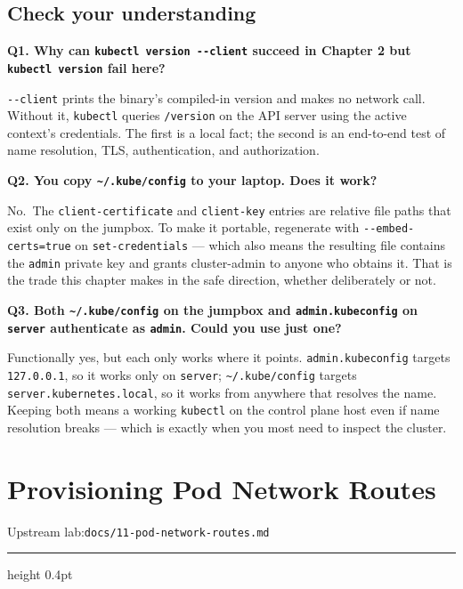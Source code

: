 \documentclass[11pt,oneside]{report}
\newcommand{\upstreamlab}[1]{%
  {\sffamily\footnotesize\color{steel}Upstream lab:\quad\texttt{#1}}\par\vspace{2pt}%
  {\color{rule}\hrule height 0.4pt}\vspace{8pt}}
\begin{document}
\hypertarget{check-your-understanding-10}{%
\section{Check your
understanding}\label{check-your-understanding-10}}

\textbf{Q1. Why can
\texttt{kubectl\ version\ -\/-client}
succeed in Chapter 2
but
\texttt{kubectl\ version}
fail here?}

\texttt{-\/-client}
prints the binary's
compiled-in version
and makes no network
call. Without it,
\texttt{kubectl}
queries
\texttt{/version} on
the API server using
the active context's
credentials. The
first is a local
fact; the second is
an end-to-end test
of name resolution,
TLS, authentication,
and authorization.

\textbf{Q2. You copy
\texttt{\textasciitilde{}/.kube/config}
to your laptop. Does
it work?}

No.~The
\texttt{client-}\allowbreak{}\texttt{certificate}
and
\texttt{client-key}
entries are relative
file paths that
exist only on the
jumpbox. To make it
portable, regenerate
with
\texttt{-\/-embed-}\allowbreak{}\texttt{certs=true}
on
\texttt{set-credentials}
--- which also means
the resulting file
contains the
\texttt{admin}
private key and
grants cluster-admin
to anyone who
obtains it. That is
the trade this
chapter makes in the
safe direction,
whether deliberately
or not.

\textbf{Q3. Both
\texttt{\textasciitilde{}/.kube/config}
on the jumpbox and
\texttt{admin.}\allowbreak{}\texttt{kubeconfig}
on \texttt{server}
authenticate as
\texttt{admin}.
Could you use just
one?}

Functionally yes,
but each only works
where it points.
\texttt{admin.}\allowbreak{}\texttt{kubeconfig}
targets
\texttt{127.0.0.1},
so it works only on
\texttt{server};
\texttt{\textasciitilde{}/.kube/config}
targets
\texttt{server.}\allowbreak{}\texttt{kubernetes.}\allowbreak{}\texttt{local},
so it works from
anywhere that
resolves the name.
Keeping both means a
working
\texttt{kubectl} on
the control plane
host even if name
resolution breaks
--- which is exactly
when you most need
to inspect the
cluster.

\hypertarget{chap-11}{%
\chapter{Provisioning
Pod Network
Routes}\label{chap-11}}

\upstreamlab{docs/11-pod-network-routes.md}
\end{document}
